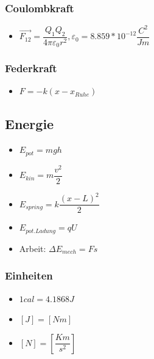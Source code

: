 \documentclass[8pt,a4paper]{scrartcl}
\begin{document}
\begin{multicols*}{3}
				\subsubsection{Coulombkraft}
					\begin{itemize}\itemsep0pt				
						\item $\overrightarrow{F_{12}}=\dfrac{Q_{1}Q_{2}}{4\pi\varepsilon_{0}r^{2}}, \varepsilon_{0}=8.859*10^{-12}\dfrac{C^{2}}{Jm}$
					\end{itemize}
				\subsubsection{Federkraft}
					\begin{itemize}\itemsep0pt				
						\item $F = -k(x-x_{Ruhe})$
					\end{itemize}
			
		\subsection{Energie}
			\begin{itemize}\itemsep0pt				
				\item $E_{pot}=mgh$
				\item $E_{kin}=m\dfrac{v^{2}}{2}$
				\item $E_{spring}=k\dfrac{(x-L)^{2}}{2}$
				\item $E_{pot. Ladung}=qU$
				\item Arbeit: $\Delta E_{mech}=Fs$			
			\end{itemize}
			\subsubsection{Einheiten}		
			\begin{itemize}\itemsep0pt		
				\item $1 cal = 4.1868 J$		
				\item $[J]=[Nm]$
				\item $[N]=[\dfrac{Km}{s^{2}}]$
			\end{itemize}


\end{multicols*}
\end{document}
